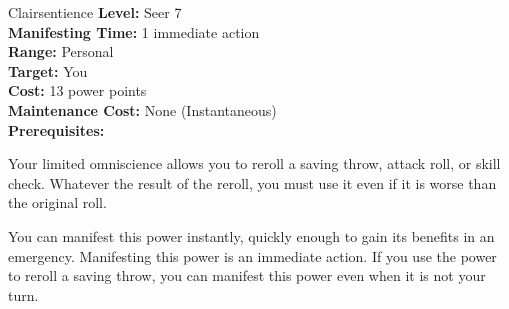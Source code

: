 {Clairsentience}
{
	\textbf{Level:}
	Seer 7\\
	\textbf{Manifesting Time:}
	1 immediate action\\
	\textbf{Range:}
	Personal\\
	\textbf{Target:}
	You\\
	\textbf{Cost:}
	13 power points\\
	\textbf{Maintenance Cost:}
	None (Instantaneous)\\
	\textbf{Prerequisites:}
	\\
}
{
	Your limited omniscience allows you to reroll a saving throw, attack roll, or skill check. Whatever the result of the reroll, you must use it even if it is worse than the original roll.

	You can manifest this power instantly, quickly enough to gain its benefits in an emergency. Manifesting this power is an immediate action. If you use the power to reroll a saving throw, you can manifest this power even when it is not your turn.
}